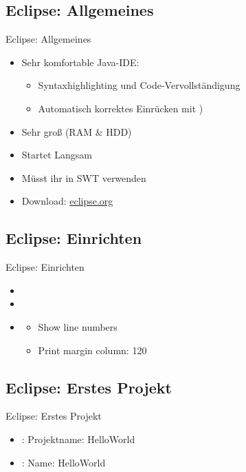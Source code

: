 \documentclass[usepdftitle=false,hyperref={pdfpagelabels=false}]{beamer}
\begin{document}
\subsection{Eclipse: Allgemeines}
\begin{frame}{Eclipse: Allgemeines}
    \begin{itemize}
        \item Sehr komfortable Java-IDE:
        \begin{itemize}
            \item Syntaxhighlighting und Code-Vervollständigung
            \item Automatisch korrektes Einrücken mit )
        \end{itemize}
        \item Sehr groß (RAM \& HDD)
        \item Startet Langsam
        \item Müsst ihr in SWT verwenden
        \item Download: \href{http://www.eclipse.org/}{eclipse.org}
    \end{itemize}
\end{frame}

\subsection{Eclipse: Einrichten}
\begin{frame}{Eclipse: Einrichten}
    \begin{itemize}
        \item {}
        \item {}
        \item {}
            \begin{itemize}
                \item Show line numbers
                \item Print margin column: 120
            \end{itemize}
    \end{itemize}
\end{frame}


\subsection{Eclipse: Erstes Projekt}
\begin{frame}{Eclipse: Erstes Projekt}
    \begin{itemize}
        \item {}: Projektname: HelloWorld
        \item {}: Name: HelloWorld
    \end{itemize}
\end{frame}
\end{document}
